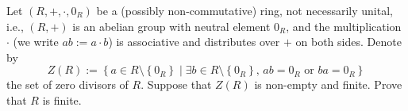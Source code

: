 \begin{problem}
    Let \( \left(R, +, \cdot, 0_R\right) \) be a (possibly non-commutative) ring, not necessarily unital, i.e., \( \left(R, +\right) \) is an abelian group with neutral element \( 0_R \), and the multiplication \( \cdot \) (we write \( ab := a \cdot b \)) is associative and distributes over \( + \) on both sides. Denote by
    \[
        Z\left(R\right) := \left\{ a \in R \setminus \left\{0_R\right\} \mid \exists b \in R \setminus \left\{0_R\right\}, \, ab = 0_R \text{ or } ba = 0_R \right\}
    \]
    the set of zero divisors of \( R \). Suppose that \( Z\left(R\right) \) is non-empty and finite. Prove that \( R \) is finite.
\end{problem}
